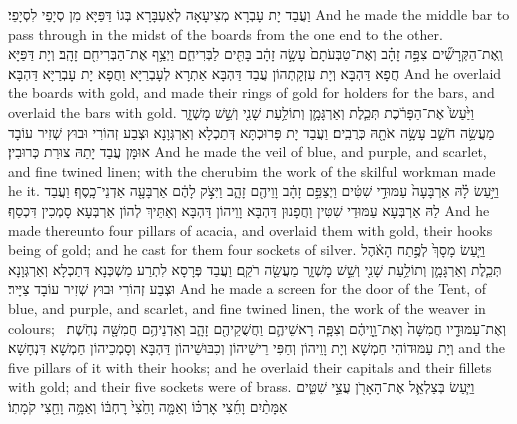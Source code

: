 {{וַעֲבַד יָת עָבְרָא מְצִיעָאָה לְאַעְבָּרָא בְּגוֹ דַּפַּיָּא מִן סְיָפֵי לִסְיָפֵי׃}
{And he made the middle bar to pass through in the midst of the boards from the one end to the other.}{}
{וְֽאֶת־הַקְּרָשִׁ֞ים צִפָּ֣ה זָהָ֗ב וְאֶת־טַבְּעֹתָם֙ עָשָׂ֣ה זָהָ֔ב בָּתִּ֖ים לַבְּרִיחִ֑ם וַיְצַ֥ף אֶת־הַבְּרִיחִ֖ם זָהָֽב׃}
{וְיָת דַּפַּיָּא חֲפָא דַּהְבָּא וְיָת עִזְקָתְהוֹן עֲבַד דַּהְבָּא אַתְרָא לְעָבְרַיָּא וַחֲפָא יָת עָבְרַיָּא דַּהְבָּא׃}
{And he overlaid the boards with gold, and made their rings of gold for holders for the bars, and overlaid the bars with gold.}{}
{וַיַּ֙עַשׂ֙ אֶת־הַפָּרֹ֔כֶת תְּכֵ֧לֶת וְאַרְגָּמָ֛ן וְתוֹלַ֥עַת שָׁנִ֖י וְשֵׁ֣שׁ מׇשְׁזָ֑ר מַעֲשֵׂ֥ה חֹשֵׁ֛ב עָשָׂ֥ה אֹתָ֖הּ כְּרֻבִֽים׃}
{וַעֲבַד יָת פָּרוּכְתָּא דְּתַכְלָא וְאַרְגְּוָנָא וּצְבַע זְהוֹרִי וּבוּץ שְׁזִיר עוֹבָד אוּמָּן עֲבַד יָתַהּ צוּרַת כְּרוּבִין׃}
{And he made the veil of blue, and purple, and scarlet, and fine twined linen; with the cherubim the work of the skilful workman made he it.}{}
{וַיַּ֣עַשׂ לָ֗הּ אַרְבָּעָה֙ עַמּוּדֵ֣י שִׁטִּ֔ים וַיְצַפֵּ֣ם זָהָ֔ב וָוֵיהֶ֖ם זָהָ֑ב וַיִּצֹ֣ק לָהֶ֔ם אַרְבָּעָ֖ה אַדְנֵי־כָֽסֶף׃}
{וַעֲבַד לַהּ אַרְבְּעָא עַמּוּדֵי שִׁטִּין וַחֲפָנוּן דַּהְבָּא וָוֵיהוֹן דַּהְבָּא וְאַתֵּיךְ לְהוֹן אַרְבְּעָא סָמְכִין דִּכְסַף׃}
{And he made thereunto four pillars of acacia, and overlaid them with gold, their hooks being of gold; and he cast for them four sockets of silver.}{}
{וַיַּ֤עַשׂ מָסָךְ֙ לְפֶ֣תַח הָאֹ֔הֶל תְּכֵ֧לֶת וְאַרְגָּמָ֛ן וְתוֹלַ֥עַת שָׁנִ֖י וְשֵׁ֣שׁ מׇשְׁזָ֑ר מַעֲשֵׂ֖ה רֹקֵֽם׃}
{וַעֲבַד פְּרָסָא לִתְרַע מַשְׁכְּנָא דְּתַכְלָא וְאַרְגְּוָנָא וּצְבַע זְהוֹרִי וּבוּץ שְׁזִיר עוֹבָד צַיָּיר׃}
{And he made a screen for the door of the Tent, of blue, and purple, and scarlet, and fine twined linen, the work of the weaver in colours;}{}
{וְאֶת־עַמּוּדָ֤יו חֲמִשָּׁה֙ וְאֶת־וָ֣וֵיהֶ֔ם וְצִפָּ֧ה רָאשֵׁיהֶ֛ם וַחֲשֻׁקֵיהֶ֖ם זָהָ֑ב וְאַדְנֵיהֶ֥ם חֲמִשָּׁ֖ה נְחֹֽשֶׁת׃ \petucha }
{וְיָת עַמּוּדוֹהִי חַמְשָׁא וְיָת וָוֵיהוֹן וְחַפִּי רֵישֵׁיהוֹן וְכִבּוּשֵׁיהוֹן דַּהְבָּא וְסָמְכֵיהוֹן חַמְשָׁא דִּנְחָשָׁא׃}
{and the five pillars of it with their hooks; and he overlaid their capitals and their fillets with gold; and their five sockets were of brass.}{}
\newperek
{}%
{וַיַּ֧עַשׂ בְּצַלְאֵ֛ל אֶת־הָאָרֹ֖ן עֲצֵ֣י שִׁטִּ֑ים אַמָּתַ֨יִם וָחֵ֜צִי אׇרְכּ֗וֹ וְאַמָּ֤ה וָחֵ֙צִי֙ רׇחְבּ֔וֹ וְאַמָּ֥ה וָחֵ֖צִי קֹמָתֽוֹ׃
}}
